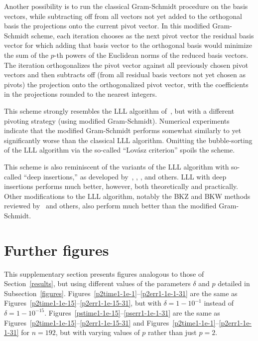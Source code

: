 \documentclass[supplement,hidelinks,onefignum,onetabnum]{siamart220329}
\begin{document}
Another possibility is to run the classical Gram-Schmidt procedure
on the basis vectors, while subtracting off from all vectors
not yet added to the orthogonal basis the projections
onto the current pivot vector. In this modified Gram-Schmidt scheme,
each iteration chooses as the next pivot vector the residual basis vector
for which adding that basis vector to the orthogonal basis would
minimize the sum of the $p$-th powers of the Euclidean norms
of the reduced basis vectors. The iteration orthogonalizes the pivot vector
against all previously chosen pivot vectors and then subtracts off
(from all residual basis vectors not yet chosen as pivots)
the projection onto the orthogonalized pivot vector,
with the coefficients in the projections rounded to the nearest integers.

This scheme strongly resembles the LLL algorithm
of~\cite{lenstra-lenstra-lovasz}, but with a different pivoting strategy
(using modified Gram-Schmidt). Numerical experiments indicate that
the modified Gram-Schmidt performs somewhat similarly to
yet significantly worse than the classical LLL algorithm.
Omitting the bubble-sorting of the LLL algorithm
via the so-called ``Lov\'asz criterion'' spoils the scheme.

This scheme is also reminiscent of the variants of the LLL algorithm
with so-called ``deep insertions,'' as developed
by~\cite{schnorr-euchner}, \cite{fontein-schneider-wagner},
\cite{yasuda-yamaguchi}, and others.
LLL with deep insertions performs much better, however,
both theoretically and practically.
Other modifications to the LLL algorithm,
notably the BKZ and BKW methods reviewed by~\cite{nguyen-vallee} and others,
also perform much better than the modified Gram-Schmidt.



\section{Further figures}
\label{further}

This supplementary section presents figures analogous
to those of Section~\ref{results},
but using different values of the parameters $\delta$ and $p$
detailed in Subsection~\ref{figures}.
Figures~\ref{p2time1-1e-1}--\ref{p2err1-1e-1-31} are the same
as Figures~\ref{p2time1-1e-15}--\ref{p2err1-1e-15-31},
but with $\delta = 1 - 10^{-1}$ instead of $\delta = 1 - 10^{-15}$.
Figures~\ref{pstime1-1e-15}--\ref{pserr1-1e-1-31} are the same
as Figures~\ref{p2time1-1e-15}--\ref{p2err1-1e-15-31}
and Figures~\ref{p2time1-1e-1}--\ref{p2err1-1e-1-31} for $n = 192$,
but with varying values of $p$ rather than just $p = 2$.
\end{document}
